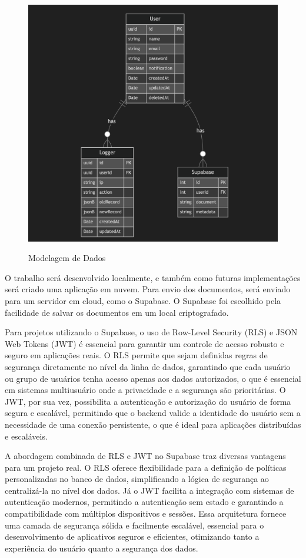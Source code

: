 \begin{figure}[!ht]
    \centering
    \caption{Modelagem de Dados}
    \includegraphics[scale=0.44]{assets/data-model}
    \label{fig:data-model}
    \tiny
    \sourcemedaddy
\end{figure}

O trabalho será desenvolvido localmente, e também como futuras implementações será
criado uma aplicação em nuvem.
Para envio dos documentos, será enviado para um servidor em
cloud, como o Supabase.
O Supabase foi escolhido pela facilidade de salvar os documentos em
um local criptografado.

Para projetos utilizando o Supabase, o uso de Row-Level Security (RLS) e JSON Web Tokens (JWT) é essencial para garantir um controle de acesso robusto e seguro em aplicações reais.
O RLS permite que sejam definidas regras de segurança diretamente no nível da linha de dados, garantindo que cada usuário ou grupo de usuários tenha acesso apenas aos dados autorizados, o que é essencial em sistemas multiusuário onde a privacidade e a segurança são prioritárias.
O JWT, por sua vez, possibilita a autenticação e autorização do usuário de forma segura e escalável, permitindo que o backend valide a identidade do usuário sem a necessidade de uma conexão persistente, o que é ideal para aplicações distribuídas e escaláveis.

A abordagem combinada de RLS e JWT no Supabase traz diversas vantagens para um projeto real.
O RLS oferece flexibilidade para a definição de políticas personalizadas no banco de dados, simplificando a lógica de segurança ao centralizá-la no nível dos dados.
Já o JWT facilita a integração com sistemas de autenticação modernos, permitindo a autenticação sem estado e garantindo a compatibilidade com múltiplos dispositivos e sessões.
Essa arquitetura fornece uma camada de segurança sólida e facilmente escalável, essencial para o desenvolvimento de aplicativos seguros e eficientes, otimizando tanto a experiência do usuário quanto a segurança dos dados.





